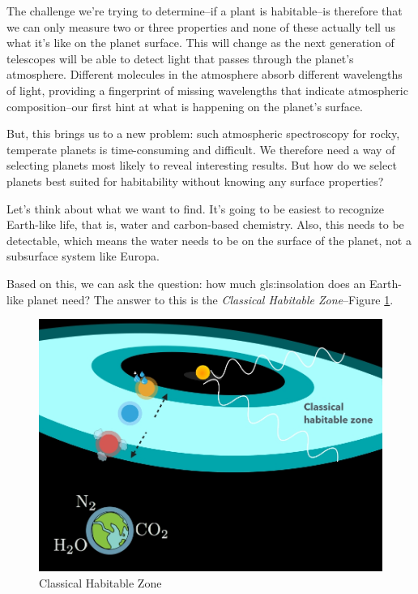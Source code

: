 \documentclass[]{article}
\begin{document}
The challenge we're trying to determine--if a plant is habitable--is therefore that we can only measure two or three properties and none of these actually tell us what it's like on the planet surface.
This will change as the next generation of telescopes will be able to detect light that passes through the planet's atmosphere.
Different molecules in the atmosphere absorb different wavelengths of light, providing a fingerprint of missing wavelengths that indicate atmospheric composition--our first hint at what is happening on the planet's surface.

But, this brings us to a new problem: such atmospheric spectroscopy for rocky, temperate planets is time-consuming and difficult.
We therefore need a way of selecting planets most likely to reveal interesting results.
But how do we select planets best suited for habitability without knowing any surface properties?

Let's think about what we want to find.
It's going to be easiest to recognize Earth-like life, that is, water and
carbon-based chemistry.
Also, this needs to be detectable, which means the water needs to be on the surface of the planet, not a subsurface system like Europa.

Based on this, we can ask the question: how much \gls{gls:insolation} does an Earth-like planet need?
The answer to this is the \emph{Classical Habitable Zone}--Figure \ref{fig:classical:habitable:zone}.

\begin{figure}[H]
	\caption{Classical Habitable Zone}\label{fig:classical:habitable:zone}
	\includegraphics[width=\textwidth]{ClassicalHabitableZone}
\end{figure}
\end{document}
